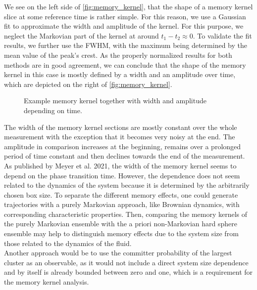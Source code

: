 We see on the left side of \autoref{fig:memory_kernel}, that the shape of a memory kernel slice at some reference time is rather simple. For this reason, we use a Gaussian fit to approximate the width and amplitude of the kernel. For this purpose, we neglect the Markovian part of the kernel at around $t_1-t_2 \approx 0$. To validate the fit results, we further use the FWHM, with the maximum being determined by the mean value of the peak's crest. As the properly normalized results for both methods are in good agreement, we can conclude that the shape of the memory kernel in this case is mostly defined by a width and an amplitude over time, which are depicted on the right of \autoref{fig:memory_kernel}.\\
\begin{figure}[h]
\begin{center}
 \hspace{0.5cm}
\caption[Width and amplitude of memory kernel alongside an example slice]{Example memory kernel together with width and amplitude depending on time.}
\label{fig:memory_kernel}
\end{center}
\end{figure}
The width of the memory kernel sections are mostly constant over the whole measurement with the exception that it becomes very noisy at the end. The amplitude in comparison increases at the beginning, remains over a prolonged period of time constant and then declines towards the end of the measurement.\\
As published by Meyer et al. 2021\cite{Meyer2021}, the width of the memory kernel seems to depend on the phase transition time. However, the dependence does not seem related to the dynamics of the system because it is determined by the arbitrarily chosen box size. To separate the different memory effects, one could generate trajectories with a purely Markovian approach, like Brownian dynamics, with corresponding characteristic properties. Then, comparing the memory kernels of the purely Markovian ensemble with the a priori non-Markovian hard sphere ensemble may help to distinguish memory effects due to the system size from those related to the dynamics of the fluid.\\

Another approach would be to use the committer probability of the largest cluster as an observable, as it would not include a direct system size dependence and by itself is already bounded between zero and one, which is a requirement for the memory kernel analysis.
\FloatBarrier
